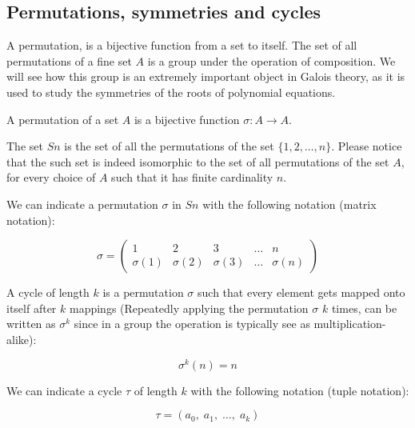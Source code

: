 \subsection{Permutations, symmetries and cycles}
A permutation, is a bijective function from a set to itself. The set of all permutations of 
a fine set $A$ is a group under the operation of composition. We will see how this group is 
an extremely important object in Galois theory, as it is used to study the symmetries of the 
roots of polynomial equations. 

\begin{definition}[Permutation]
A permutation of a set $A$ is a bijective function $\sigma: A \to A$. 
\end{definition} \vspace{0.2em}

\begin{definition}
The set $Sn$ is the set of all the permutations of the set $\{1,2,\dots,n\}$. Please 
notice that the such set is indeed isomorphic to the set of all permutations of the 
set $A$, for every choice of $A$ such that it has finite cardinality $n$.
\end{definition} \vspace{0.4em}

We can indicate a permutation $\sigma$ in $Sn$ with the following notation (matrix notation):

$$ \sigma = \begin{pmatrix} 
    1 & 2 & 3 & \dots & n \\ 
    \sigma(1) & \sigma(2) & \sigma(3) & \dots & \sigma(n) 
\end{pmatrix} $$ \vspace{0.2em}

\begin{definition}[Cycle]
A cycle of length $k$ is a permutation $\sigma$ such that 
every element gets mapped onto itself after $k$ mappings (Repeatedly applying
the permutation $\sigma$ $k$ times, can be written as $ \sigma^{k}$ since 
in a group the operation is typically see as multiplication-alike):

$$ \sigma^{k}(n) = n $$ \vspace{0.2em}
\end{definition} \vspace{0.2em}

We can indicate a cycle $\tau$ of length $k$ with the following notation (tuple notation):

$$ \tau = (a_0,\; a_1,\; \dots,\; a_k ) $$ \vspace{0.2em}

